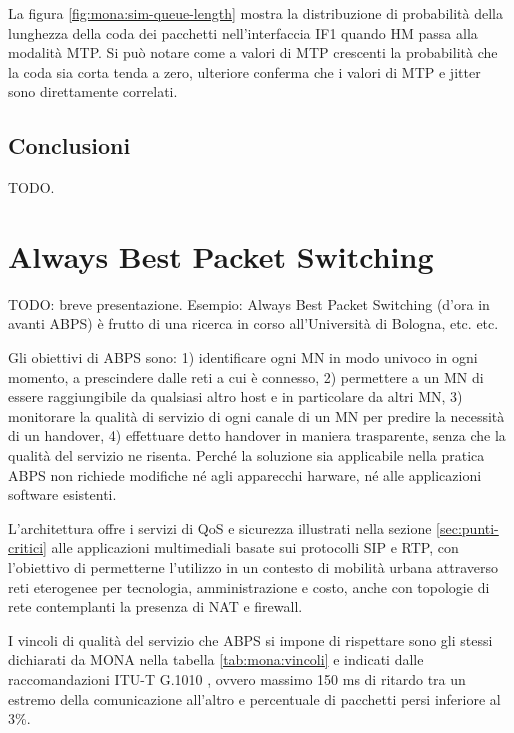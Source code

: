 \documentclass[12pt,a4paper,openright,twoside]{book}
\begin{document}
La figura \ref{fig:mona:sim-queue-length} mostra la distribuzione di
probabilità della lunghezza della coda dei pacchetti nell'interfaccia
IF1 quando HM passa alla modalità MTP. Si può notare come a valori di
MTP crescenti la probabilità che la coda sia corta tenda a zero,
ulteriore conferma che i valori di MTP e jitter sono direttamente
correlati.




\section{Conclusioni}

TODO.

\clearpage{\pagestyle{empty}\cleardoublepage}

\chapter{Always Best Packet Switching}
TODO: breve presentazione. Esempio: Always Best Packet Switching
(d'ora in avanti ABPS) è frutto di una ricerca in corso all'Università
di Bologna, etc. etc.

Gli obiettivi di ABPS sono: 1) identificare ogni MN in modo univoco in
ogni momento, a prescindere dalle reti a cui è connesso, 2) permettere
a un MN di essere raggiungibile da qualsiasi altro host e in
particolare da altri MN, 3) monitorare la qualità di servizio di ogni
canale di un MN per predire la necessità di un handover, 4) effettuare
detto handover in maniera trasparente, senza che la qualità del
servizio ne risenta. Perché la soluzione sia applicabile nella pratica
ABPS non richiede modifiche né agli apparecchi harware, né alle
applicazioni software esistenti.

L'architettura offre i servizi di QoS e sicurezza illustrati nella
sezione \ref{sec:punti-critici} alle applicazioni multimediali basate
sui protocolli SIP e RTP, con l'obiettivo di permetterne l'utilizzo in
un contesto di mobilità urbana attraverso reti eterogenee per
tecnologia, amministrazione e costo, anche con topologie di rete
contemplanti la presenza di NAT e firewall.

I vincoli di qualità del servizio che ABPS si impone di rispettare
sono gli stessi dichiarati da MONA nella tabella
\ref{tab:mona:vincoli} e indicati dalle raccomandazioni ITU-T G.1010
\cite{bib:itu-t}, ovvero massimo 150 ms di ritardo tra un estremo
della comunicazione all'altro e percentuale di pacchetti persi
inferiore al 3\%.
\end{document}
